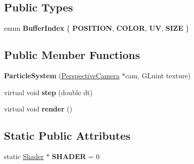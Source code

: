 \subsection*{Public Types}
\begin{DoxyCompactItemize}
\item 
\hypertarget{class_particle_system_a0cb971f2e53dbb81558ff82bef0e7ba5}{}enum {\bfseries Buffer\+Index} \{ {\bfseries P\+O\+S\+I\+T\+I\+O\+N}, 
{\bfseries C\+O\+L\+O\+R}, 
{\bfseries U\+V}, 
{\bfseries S\+I\+Z\+E}
 \}\label{class_particle_system_a0cb971f2e53dbb81558ff82bef0e7ba5}

\end{DoxyCompactItemize}
\subsection*{Public Member Functions}
\begin{DoxyCompactItemize}
\item 
\hypertarget{class_particle_system_aec4b7b019239eea443697b25b1723ae8}{}{\bfseries Particle\+System} (\hyperlink{class_perspective_camera}{Perspective\+Camera} $\ast$cam, G\+Luint texture)\label{class_particle_system_aec4b7b019239eea443697b25b1723ae8}

\item 
\hypertarget{class_particle_system_a5d76bedc89cba3a443b458a6c142b5a6}{}virtual void {\bfseries step} (double dt)\label{class_particle_system_a5d76bedc89cba3a443b458a6c142b5a6}

\item 
\hypertarget{class_particle_system_af2ec9e0fe49695569a9524f6a2238e6f}{}virtual void {\bfseries render} ()\label{class_particle_system_af2ec9e0fe49695569a9524f6a2238e6f}

\end{DoxyCompactItemize}
\subsection*{Static Public Attributes}
\begin{DoxyCompactItemize}
\item 
\hypertarget{class_particle_system_a4161327867c61aaa755895c90693620c}{}static \hyperlink{class_shader}{Shader} $\ast$ {\bfseries S\+H\+A\+D\+E\+R} = 0\label{class_particle_system_a4161327867c61aaa755895c90693620c}

\end{DoxyCompactItemize}
